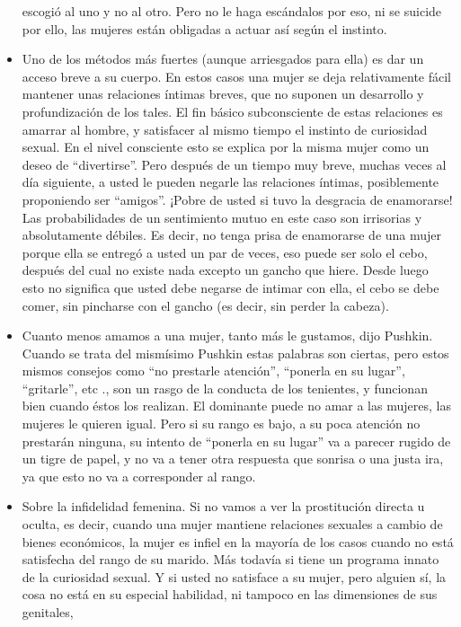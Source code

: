 \begin{itemize}
  escogió al uno y no al otro. Pero no le haga escándalos por eso, ni se
  suicide por ello, las mujeres están obligadas a actuar así según el
  instinto.
\item
  Uno de los métodos más fuertes (aunque arriesgados para ella) es dar
  un acceso breve a su cuerpo. En estos casos una mujer se deja
  relativamente fácil mantener unas relaciones íntimas breves, que no
  suponen un desarrollo y profundización de los tales. El fin básico
  subconsciente de estas relaciones es amarrar al hombre, y satisfacer
  al mismo tiempo el instinto de curiosidad sexual. En el nivel
  consciente esto se explica por la misma mujer como un deseo de
  ``divertirse''. Pero después de un tiempo muy breve, muchas veces al
  día siguiente, a usted le pueden negarle las relaciones íntimas,
  posiblemente proponiendo ser ``amigos''. ¡Pobre de usted si tuvo la
  desgracia de enamorarse! Las probabilidades de un sentimiento mutuo en
  este caso son irrisorias y absolutamente débiles. Es decir, no tenga
  prisa de enamorarse de una mujer porque ella se entregó a usted un par
  de veces, eso puede ser solo el cebo, después del cual no existe nada
  excepto un gancho que hiere. Desde luego esto no significa que usted
  debe negarse de intimar con ella, el cebo se debe comer, sin pincharse
  con el gancho (es decir, sin perder la cabeza).
\item
  Cuanto menos amamos a una mujer, tanto más le gustamos, dijo Pushkin.
  Cuando se trata del mismísimo Pushkin estas palabras son ciertas, pero
  estos mismos consejos como ``no prestarle atención'', ``ponerla en su
  lugar'', ``gritarle'', etc ., son un rasgo de la conducta de los
  tenientes, y funcionan bien cuando éstos los realizan. El dominante
  puede no amar a las mujeres, las mujeres le quieren igual. Pero si su
  rango es bajo, a su poca atención no prestarán ninguna, su intento de
  ``ponerla en su lugar'' va a parecer rugido de un tigre de papel, y no
  va a tener otra respuesta que sonrisa o una justa ira, ya que esto no
  va a corresponder al rango.
\item
  Sobre la infidelidad femenina. Si no vamos a ver la prostitución
  directa u oculta, es decir, cuando una mujer mantiene relaciones
  sexuales a cambio de bienes económicos, la mujer es infiel en la
  mayoría de los casos cuando no está satisfecha del rango de su marido.
  Más todavía si tiene un programa innato de la curiosidad sexual. Y si
  usted no satisface a su mujer, pero alguien sí, la cosa no está en su
  especial habilidad, ni tampoco en las dimensiones de sus genitales,

\end{itemize}
